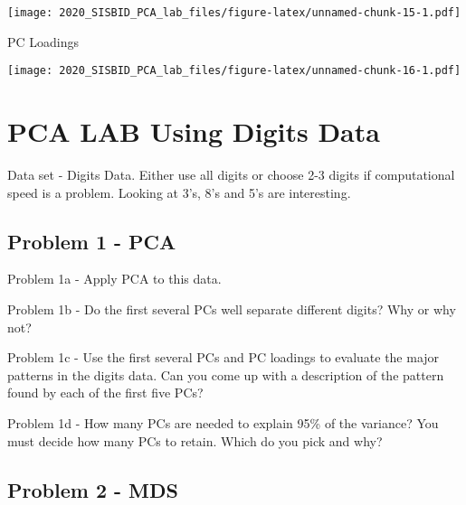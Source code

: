 \documentclass[
]{article}
\newenvironment{Shaded}{\begin{snugshade}}{\end{snugshade}}
\newcommand{\ControlFlowTok}[1]{\textcolor[rgb]{0.13,0.29,0.53}{\textbf{#1}}}
\newcommand{\DataTypeTok}[1]{\textcolor[rgb]{0.13,0.29,0.53}{#1}}
\newcommand{\DecValTok}[1]{\textcolor[rgb]{0.00,0.00,0.81}{#1}}
\newcommand{\KeywordTok}[1]{\textcolor[rgb]{0.13,0.29,0.53}{\textbf{#1}}}
\newcommand{\NormalTok}[1]{#1}
\newcommand{\OperatorTok}[1]{\textcolor[rgb]{0.81,0.36,0.00}{\textbf{#1}}}
\begin{document}
\texttt{[image: 2020\_SISBID\_PCA\_lab\_files/figure-latex/unnamed-chunk-15-1.pdf]}

PC Loadings

\begin{Shaded}
\end{Shaded}

\texttt{[image: 2020\_SISBID\_PCA\_lab\_files/figure-latex/unnamed-chunk-16-1.pdf]}

\hypertarget{pca-lab-using-digits-data}{%
\section{PCA LAB Using Digits Data}\label{pca-lab-using-digits-data}}

Data set - Digits Data. Either use all digits or choose 2-3 digits if
computational speed is a problem. Looking at 3's, 8's and 5's are
interesting.

\hypertarget{problem-1---pca}{%
\subsection{Problem 1 - PCA}\label{problem-1---pca}}

Problem 1a - Apply PCA to this data.

Problem 1b - Do the first several PCs well separate different digits?
Why or why not?

Problem 1c - Use the first several PCs and PC loadings to evaluate the
major patterns in the digits data. Can you come up with a description of
the pattern found by each of the first five PCs?

Problem 1d - How many PCs are needed to explain 95\% of the variance?
You must decide how many PCs to retain. Which do you pick and why?

\hypertarget{problem-2---mds}{%
\subsection{Problem 2 - MDS}\label{problem-2---mds}}
\end{document}

